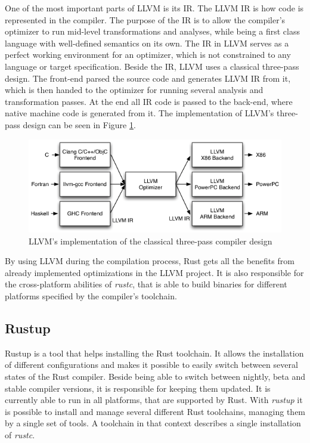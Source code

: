One of the most important parts of \ac{LLVM} is its \ac{IR}. The \ac{LLVM} \ac{IR} is how code is represented in the compiler. The purpose of the \ac{IR} is to allow the compiler's optimizer to run mid-level transformations and analyses, while being a first class language with well-defined semantics on its own. The \ac{IR} in \ac{LLVM} serves as a perfect working environment for an optimizer, which is not constrained to any language or target specification. Beside the \ac{IR}, \ac{LLVM} uses a classical three-pass design. The front-end parsed the source code and generates \ac{LLVM} \ac{IR} from it, which is then handed to the optimizer for running several analysis and transformation passes. At the end all \ac{IR} code is passed to the back-end, where native machine code is generated from it. The implementation of \ac{LLVM}'s three-pass design can be seen in Figure \ref{fig:llvm_design}.

\begin{figure}[h!]
	\centering \includegraphics[width=\linewidth]{PICs/llvm_design.png}
	\caption{LLVM's implementation of the classical three-pass compiler design}
	\label{fig:llvm_design}
\end{figure}


\noindent
By using \ac{LLVM} during the compilation process, Rust gets all the benefits from already implemented optimizations in the \ac{LLVM} project. It is also responsible for the cross-platform abilities of \textit{rustc}, that is able to build binaries for different platforms specified by the compiler's toolchain.


\subsection{Rustup}

Rustup is a tool that helps installing the Rust toolchain. It allows the installation of different configurations and makes it possible to easily switch between several states of the Rust compiler. Beside being able to switch between nightly, beta and stable compiler versions, it is responsible for keeping them updated. It is currently able to run in all platforms, that are supported by Rust. With \textit{rustup} it is possible to install and manage several different Rust toolchains, managing them by a single set of tools. A toolchain in that context describes a single installation of \textit{rustc}.

